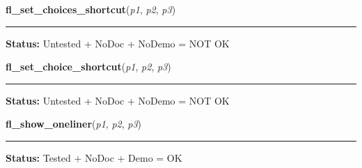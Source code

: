     \vspace{0.5ex}

\hspace{.8\funcindent}\begin{boxedminipage}{\funcwidth}

    \raggedright \textbf{fl\_set\_choices\_shortcut}(\textit{p1}, \textit{p2}, \textit{p3})

    \vspace{-1.5ex}

    \rule{\textwidth}{0.5\fboxrule}
\setlength{\parskip}{2ex}
\setlength{\parskip}{1ex}
\textbf{Status:} Untested + NoDoc + NoDemo = NOT OK



    \end{boxedminipage}

    \label{xformslib:flgoodies:fl_set_choices_shortcut}

    \vspace{0.5ex}

\hspace{.8\funcindent}\begin{boxedminipage}{\funcwidth}

    \raggedright \textbf{fl\_set\_choice\_shortcut}(\textit{p1}, \textit{p2}, \textit{p3})

    \vspace{-1.5ex}

    \rule{\textwidth}{0.5\fboxrule}
\setlength{\parskip}{2ex}
\setlength{\parskip}{1ex}
\textbf{Status:} Untested + NoDoc + NoDemo = NOT OK



    \end{boxedminipage}

    \label{xformslib:flgoodies:fl_show_oneliner}

    \vspace{0.5ex}

\hspace{.8\funcindent}\begin{boxedminipage}{\funcwidth}

    \raggedright \textbf{fl\_show\_oneliner}(\textit{p1}, \textit{p2}, \textit{p3})

    \vspace{-1.5ex}

    \rule{\textwidth}{0.5\fboxrule}
\setlength{\parskip}{2ex}
\setlength{\parskip}{1ex}
\textbf{Status:} Tested + NoDoc + Demo = OK



    \end{boxedminipage}

